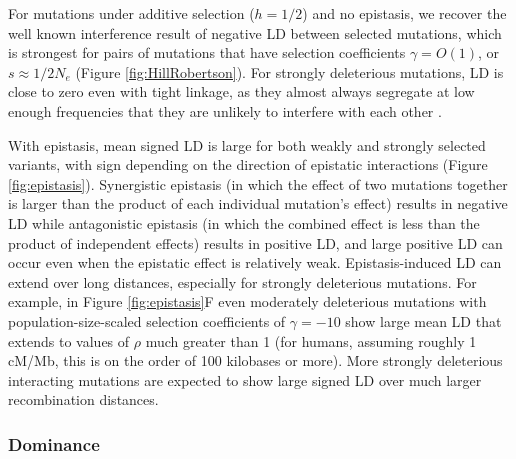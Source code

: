 \documentclass[]{article}
\begin{document}
For mutations under additive selection (\(h=1/2\)) and no epistasis, we
recover the well known \citet{Hill1966-gv} interference result of negative LD
between selected mutations, which is strongest for pairs of mutations that have
selection coefficients \(\gamma = O(1)\), or \(s \approx 1/2N_e\) (Figure
\ref{fig:HillRobertson}).
For strongly deleterious mutations, LD is close to zero even
with tight linkage, as they almost always segregate at low enough frequencies
that they are unlikely to interfere with each other \citep{McVean2000-ox}.

With epistasis, mean signed LD is large for both weakly and strongly selected
variants, with sign depending on the direction of epistatic interactions
(Figure \ref{fig:epistasis}).
Synergistic epistasis (in which the effect of two mutations together is larger than
the product of each individual mutation's effect) results in negative LD while
antagonistic epistasis (in which the combined effect is less than the product of
independent effects) results in positive LD, and large positive LD can occur
even when the epistatic effect is relatively weak. Epistasis-induced LD can
extend over long distances, especially for strongly deleterious mutations. For
example, in Figure \ref{fig:epistasis}F even moderately deleterious mutations with
population-size-scaled selection coefficients of \(\gamma=-10\) show large mean
LD that extends to values of \(\rho\) much greater than 1 (for humans, assuming
roughly 1 cM/Mb, this is on the order of 100 kilobases or more).
More strongly deleterious interacting mutations are expected to show large
signed LD over much larger recombination distances.

\subsubsection{Dominance}\label{sec:dominance}
\end{document}
